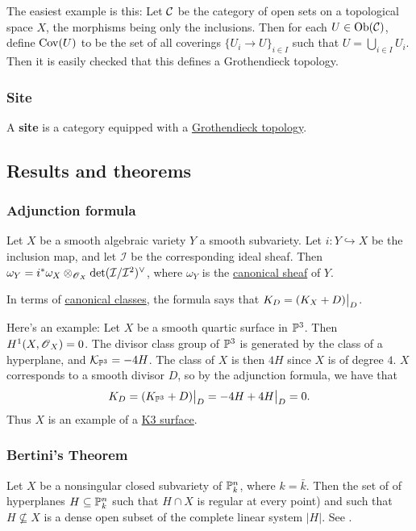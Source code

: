 \documentclass[11pt, english]{article}
\begin{document}
The easiest example is this: Let $\mathcal{C}$ be the category of open sets on a topological space $X$, the morphisms being only the inclusions. Then for each $U \in \mathrm{Ob}(\mathcal{C})$, define $\operatorname{Cov}(U)$ to be the set of all coverings $\{ U_i \to U \}_{i \in I}$ such that $U = \bigcup_{i\in I} U_i$. Then it is easily checked that this defines a Grothendieck topology.

\subsubsection{Site}
\label{site}

A \textbf{site} is a category equipped with a \hyperref[grothendiecktopology]{Grothendieck topology}.

\subsection{Results and theorems}
\subsubsection{Adjunction formula}
\label{adjunction}

Let $X$ be a smooth algebraic variety $Y$ a smooth subvariety. Let $i:Y \hookrightarrow X$ be the inclusion map, and let $\mathcal I$ be the corresponding ideal sheaf. Then $\omega_Y = i^\ast \omega_X \otimes_{\operatorname{\mathscr{O}}_X} \det(\mathcal I/\mathcal I^2)^\vee$, where $\omega_Y$ is the \hyperref[canonicalsheaf]{canonical sheaf} of $Y$.

In terms of \hyperref[canonicaldivisor]{canonical classes}, the formula says that $K_D = \restr{(K_X + D)}{D}$. 

Here's an example: Let $X$ be a smooth quartic surface in $\mathbb{P}^3$. Then $H^1(X,\operatorname{\mathscr{O}}_X)=0$. The divisor class group of $\mathbb{P}^3$ is generated by the class of a hyperplane, and $\mathcal K_{\mathbb{P}^3}=-4H$. The class of $X$ is then $4H$ since $X$ is of degree $4$. $X$ corresponds to a smooth divisor $D$, so by the adjunction formula, we have that
\[
K_D = \restr{(K_{\PP^3}+D)}{D} = \restr{-4H+4H}{D} = 0.
\]
Thus $X$ is an example of a \hyperref[k3]{K3 surface}. 


\subsubsection{Bertini's Theorem}
\label{bertini}
Let $X$ be a nonsingular closed subvariety of $\mathbb{P}_k^n$, where $k=\bar k$. Then the set of of hyperplanes $H \subseteq \mathbb{P}_k^n$ such that $H \cap X$ is regular at every point) and such that $H\not  \subseteq X$ is a dense open subset of the complete linear system $|H|$. See \cite[Thm II.8.18]{hartshorne}.
\end{document}
